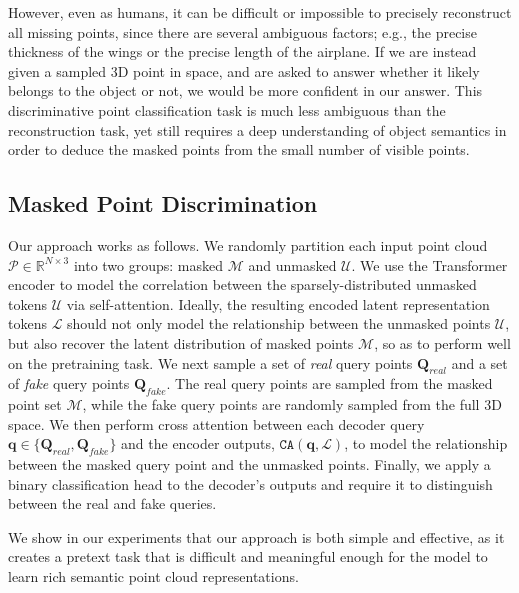 \documentclass[runningheads]{llncs}
\begin{document}
However, even as humans, it can be difficult or impossible to precisely reconstruct all missing points, since there are several ambiguous factors; e.g., the precise thickness of the wings or the precise length of the airplane. If we are instead given a sampled 3D point in space, and are asked to answer whether it likely belongs to the object or not, we would be more confident in our answer.  This discriminative point classification task is much less ambiguous than the reconstruction task, yet still requires a deep understanding of object semantics in order to deduce the masked points from the small number of visible points.

\subsection{Masked Point Discrimination}\label{sec:dmpm}

Our approach works as follows.  We randomly partition each input point cloud $\mathcal{P} \in \mathbb{R}^{N \times 3}$ into two groups: masked $\mathcal{M}$ and unmasked $\mathcal{U}$.  We use the Transformer encoder to model the correlation between the sparsely-distributed unmasked tokens $\mathcal{U}$ via self-attention.
Ideally, the resulting encoded latent representation tokens $\mathcal{L}$ should not only model the relationship between the unmasked points $\mathcal{U}$, but also recover the latent distribution of masked points $\mathcal{M}$, so as to perform well on the pretraining task.
We next sample a set of \emph{real} query points $\mathbf{Q}_{real}$ and a set of \emph{fake} query points $\mathbf{Q}_{fake}$.  The real query points are sampled from the masked point set $\mathcal{M}$, while the fake query points are randomly sampled from the full 3D space.
We then perform cross attention between each decoder query $\textbf{q} \in \{\mathbf{Q}_{real}, \mathbf{Q}_{fake}\}$ and the  encoder outputs, $\mathtt{CA}(\textbf{q}, \mathcal{L})$, to model the relationship between the masked query point and the unmasked points.
Finally, we apply a binary classification head to the decoder's outputs and require it to distinguish between the real and fake queries.  

We show in our experiments that our approach is both simple and effective, as it creates a pretext task that is difficult and meaningful enough for the model to learn rich semantic point cloud representations.

\vspace{-10pt}
\end{document}
